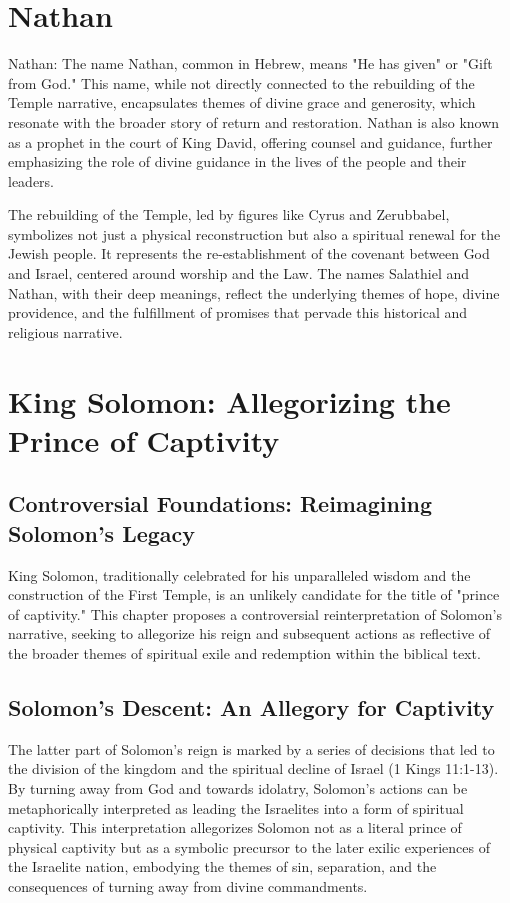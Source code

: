 \chapter{Nathan}
Nathan: The name Nathan, common in Hebrew, means "He has given" or "Gift from God." This name, while not directly connected to the rebuilding of the Temple narrative, encapsulates themes of divine grace and generosity, which resonate with the broader story of return and restoration. Nathan is also known as a prophet in the court of King David, offering counsel and guidance, further emphasizing the role of divine guidance in the lives of the people and their leaders.

The rebuilding of the Temple, led by figures like Cyrus and Zerubbabel, symbolizes not just a physical reconstruction but also a spiritual renewal for the Jewish people. It represents the re-establishment of the covenant between God and Israel, centered around worship and the Law. The names Salathiel and Nathan, with their deep meanings, reflect the underlying themes of hope, divine providence, and the fulfillment of promises that pervade this historical and religious narrative.

\chapter{King Solomon: Allegorizing the Prince of Captivity}

\section{Controversial Foundations: Reimagining Solomon's Legacy}

King Solomon, traditionally celebrated for his unparalleled wisdom and the construction of the First Temple, is an unlikely candidate for the title of "prince of captivity." This chapter proposes a controversial reinterpretation of Solomon's narrative, seeking to allegorize his reign and subsequent actions as reflective of the broader themes of spiritual exile and redemption within the biblical text.

\section{Solomon's Descent: An Allegory for Captivity}

The latter part of Solomon's reign is marked by a series of decisions that led to the division of the kingdom and the spiritual decline of Israel (1 Kings 11:1-13). By turning away from God and towards idolatry, Solomon's actions can be metaphorically interpreted as leading the Israelites into a form of spiritual captivity. This interpretation allegorizes Solomon not as a literal prince of physical captivity but as a symbolic precursor to the later exilic experiences of the Israelite nation, embodying the themes of sin, separation, and the consequences of turning away from divine commandments.

